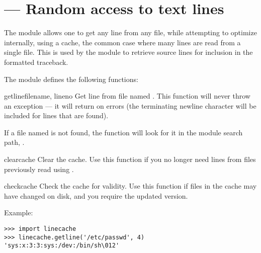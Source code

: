 \section{ ---
         Random access to text lines}



The  module allows one to get any line from any file,
while attempting to optimize internally, using a cache, the common case
where many lines are read from a single file.  This is used by the
 module to retrieve source lines for inclusion in 
the formatted traceback.

The  module defines the following functions:

\begin{funcdesc}{getline}{filename, lineno}
Get line  from file named . This function
will never throw an exception --- it will return  on errors
(the terminating newline character will be included for lines that are
found).

If a file named  is not found, the function will look
for it in the module search path,
.
\end{funcdesc}

\begin{funcdesc}{clearcache}{}
Clear the cache.  Use this function if you no longer need lines from
files previously read using .
\end{funcdesc}

\begin{funcdesc}{checkcache}{}
Check the cache for validity.  Use this function if files in the cache 
may have changed on disk, and you require the updated version.
\end{funcdesc}

Example:

\begin{verbatim}
>>> import linecache
>>> linecache.getline('/etc/passwd', 4)
'sys:x:3:3:sys:/dev:/bin/sh\012'
\end{verbatim}
